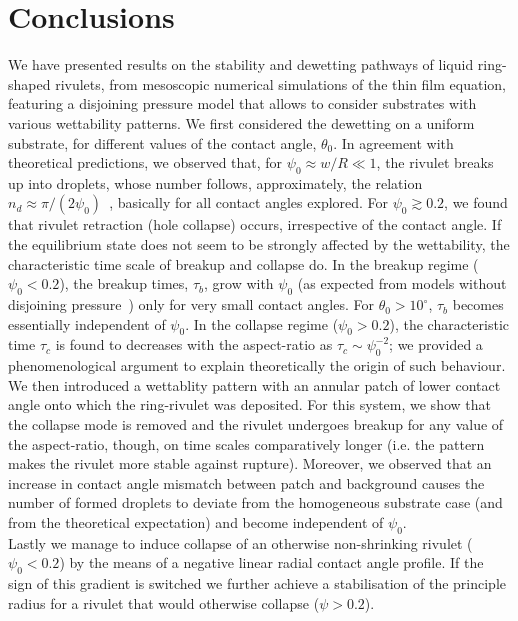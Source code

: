 \documentclass[twoside,twocolumn,9pt]{article}
\begin{document}
\section{Conclusions}\label{sec:conclu}
We have presented results on the stability and dewetting pathways of liquid ring-shaped rivulets, from mesoscopic numerical simulations of the thin film equation, featuring a disjoining pressure model that allows to consider substrates with various wettability patterns. 
We first considered the dewetting on a uniform substrate, for different values of the contact angle, $\theta_0$. 
In agreement with theoretical predictions, we observed that, for $\psi_0 \approx w/R \ll 1$, the rivulet breaks up into droplets, whose number follows, approximately, the relation $n_d \approx \pi/(2\psi_0)$~\cite{gonzalezStabilityLiquidRing2013}, basically for all contact angles explored.
For $\psi_0 \gtrsim 0.2$, we found that rivulet retraction (hole collapse) occurs, irrespective of the contact angle. 
If the equilibrium state does not seem to be strongly affected by the wettability, the characteristic time scale of breakup and collapse do. 
In the breakup regime ($\psi_0 < 0.2$), the breakup times, $\tau_b$, grow with $\psi_0$ (as expected from models without disjoining pressure~\cite{gonzalezStabilityLiquidRing2013}) only for very small contact angles. 
For $\theta_0 > 10^{\circ}$, $\tau_b$ becomes essentially independent of $\psi_0$. 
In the collapse regime ($\psi_0 > 0.2$), the characteristic time $\tau_c$ is found to decreases with the aspect-ratio as $\tau_c  \sim \psi_0^{-2}$; we provided a phenomenological argument to explain theoretically the origin of such behaviour.\\
We then introduced a wettablity pattern with an annular patch of lower contact angle onto which the ring-rivulet was deposited. For this system, we show that the collapse mode is removed and the rivulet undergoes breakup for any value of the aspect-ratio, though, on time scales comparatively longer (i.e. the pattern makes the rivulet more stable against rupture). 
Moreover, we observed that an increase in contact angle mismatch between patch and background causes the number of formed droplets to deviate from the homogeneous substrate case (and from the theoretical expectation) and become independent of $\psi_0$.\\
Lastly we manage to induce collapse of an otherwise non-shrinking rivulet ($\psi_0<0.2$) by the means of a negative linear radial contact angle profile.
If the sign of this gradient is switched we further achieve a stabilisation of the principle radius for a rivulet that would otherwise collapse ($\psi>0.2$). 
\end{document}
